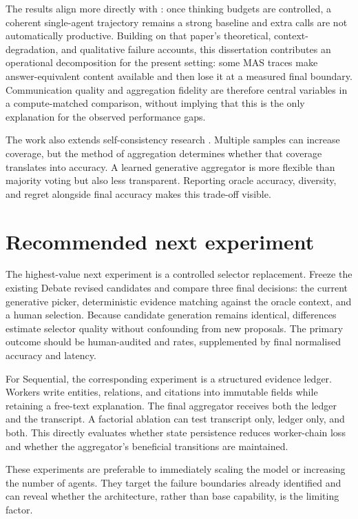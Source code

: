 The results align more directly with \citet{tran2026single}: once thinking budgets are controlled, a coherent single-agent trajectory remains a strong baseline and extra calls are not automatically productive. Building on that paper's theoretical, context-degradation, and qualitative failure accounts, this dissertation contributes an operational decomposition for the present setting: some MAS traces make answer-equivalent content available and then lose it at a measured final boundary. Communication quality and aggregation fidelity are therefore central variables in a compute-matched comparison, without implying that this is the only explanation for the observed performance gaps.

The work also extends self-consistency research \citep{wang2023selfconsistency}. Multiple samples can increase coverage, but the method of aggregation determines whether that coverage translates into accuracy. A learned generative aggregator is more flexible than majority voting but also less transparent. Reporting oracle accuracy, diversity, and regret alongside final accuracy makes this trade-off visible.

\section{Recommended next experiment}

The highest-value next experiment is a controlled selector replacement. Freeze the existing Debate revised candidates and compare three final decisions: the current generative picker, deterministic evidence matching against the oracle context, and a human selection. Because candidate generation remains identical, differences estimate selector quality without confounding from new proposals. The primary outcome should be human-audited \ctow{} and \wtoc{} rates, supplemented by final normalised accuracy and latency.

For Sequential, the corresponding experiment is a structured evidence ledger. Workers write entities, relations, and citations into immutable fields while retaining a free-text explanation. The final aggregator receives both the ledger and the transcript. A factorial ablation can test transcript only, ledger only, and both. This directly evaluates whether state persistence reduces worker-chain loss and whether the aggregator's beneficial transitions are maintained.

These experiments are preferable to immediately scaling the model or increasing the number of agents. They target the failure boundaries already identified and can reveal whether the architecture, rather than base capability, is the limiting factor.
